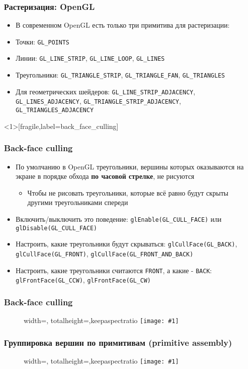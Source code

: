 \documentclass{beamer}
\newcommand{\slideimage}[1]{
  \begin{figure}
    \begin{adjustbox}{width=\textwidth, totalheight=\textheight-2\baselineskip-2\baselineskip,keepaspectratio}
      \texttt{[image: \#1]}
    \end{adjustbox}
  \end{figure}
}
\begin{document}
\begin{frame}[fragile]
\frametitle{Растеризация: OpenGL}
\begin{itemize}
\item В современном OpenGL есть только три примитива для растеризации:
\pause
\item Точки: \verb|GL_POINTS|
\pause
\item Линии: \verb|GL_LINE_STRIP|, \verb|GL_LINE_LOOP|, \verb|GL_LINES|
\pause
\item Треугольники: \verb|GL_TRIANGLE_STRIP|, \verb|GL_TRIANGLE_FAN|, \verb|GL_TRIANGLES|
\pause
\item Для геометрических шейдеров: \verb|GL_LINE_STRIP_ADJACENCY|, \verb|GL_LINES_ADJACENCY|, \verb|GL_TRIANGLE_STRIP_ADJACENCY|, \verb|GL_TRIANGLES_ADJACENCY|
\end{itemize}
\end{frame}

\begin{frame}<1>[fragile,label=back_face_culling]
\frametitle{Back-face culling}
\begin{itemize}
\item По умолчанию в OpenGL треугольники, вершины которых оказываются на экране в порядке обхода \textbf{по часовой стрелке}, {\color{red}не рисуются}
\pause
\begin{itemize}
\item Чтобы не рисовать треугольники, которые всё равно будут скрыты другими треугольниками спереди
\end{itemize}
\pause
\item Включить/выключить это поведение: \verb|glEnable(GL_CULL_FACE)| или \verb|glDisable(GL_CULL_FACE)|
\pause
\item Настроить, какие треугольники будут скрываться: \verb|glCullFace(GL_BACK)|, \verb|glCullFace(GL_FRONT)|, \verb|glCullFace(GL_FRONT_AND_BACK)|
\pause
\item Настроить, какие треугольники считаются \verb|FRONT|, а какие - \verb|BACK|: \verb|glFrontFace(GL_CCW)|, \verb|glFrontFace(GL_CW)|
\end{itemize}
\end{frame}

\begin{frame}
\frametitle{Back-face culling}
\slideimage{back-face-culling.png}
\end{frame}


\begin{frame}
\frametitle{Группировка вершин по примитивам (primitive assembly)}
\slideimage{primitives.png}
\end{frame}
\end{document}
